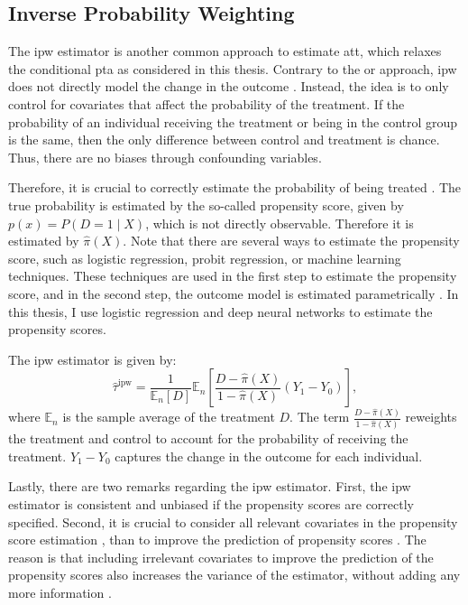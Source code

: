 \subsection{Inverse Probability Weighting}
The \ac{ipw} estimator is another common approach to estimate \ac{att}, which relaxes the conditional \ac{pta} as considered in this thesis.
Contrary to the \ac{or} approach, \ac{ipw} does not directly model the change in the outcome \citep{santannaDoublyRobustDifferenceindifferences2020}.
Instead, the idea is to only control for covariates that affect the probability of the treatment.
If the probability of an individual receiving the treatment or being in the control group is the same, then the only difference between control and treatment is chance.
Thus, there are no biases through confounding variables.

Therefore, it is crucial to correctly estimate the probability of being treated \citep{angrist2009mostly}.
The true probability is estimated by the so-called propensity score, given by $p(x) = P(D=1 \mid X)$, which is not directly observable.
Therefore it is estimated by $\hat{\pi}(X)$.
Note that there are several ways to estimate the propensity score, such as logistic regression, probit regression, or machine learning techniques.
These techniques are used in the first step to estimate the propensity score, and in the second step, the outcome model is estimated parametrically \citep{abadieSemiparametricDifferenceinDifferencesEstimators2005}.
In this thesis, I use logistic regression and deep neural networks to estimate the propensity scores.

The \ac{ipw} estimator is given by:
\begin{equation}
\hat{\tau}^{\text{ipw}} = \frac{1}{\mathbb{E}_n[D]} \mathbb{E}_n \left[ \frac{D - \hat{\pi}(X)}{1 - \hat{\pi}(X)} (Y_1 - Y_0) \right],
\label{eq:4}
\end{equation}
where $\mathbb{E}_n$  is the sample average of the treatment $D$.
The term $\frac{D - \hat{\pi}(X)}{1 - \hat{\pi}(X)}$ reweights the treatment and control to account for the probability of receiving the treatment.
$Y_1 - Y_0$ captures the change in the outcome for each individual.


Lastly, there are two remarks regarding the \ac{ipw} estimator.
First, the \ac{ipw} estimator is consistent and unbiased if the propensity scores are correctly specified.
Second, it is crucial to consider all relevant covariates in the propensity score estimation \citep{angrist2009mostly}, than to improve the prediction of propensity scores \citep{https://doi.org/10.3982/ECTA18515}.
The reason is that including irrelevant covariates to improve the prediction of the propensity scores also increases the variance of the estimator, without adding any more information \citep{hernanCausalInferenceWhat}.

